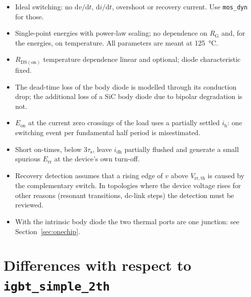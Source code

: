 \documentclass[11pt,a4paper]{article}
\newcommand{\Eon}{E_{\mathrm{on}}}
\newcommand{\Err}{E_{\mathrm{rr}}}
\newcommand{\Rdson}{R_{\mathrm{DS(on)}}}
\newcommand{\ih}{i_{\mathrm{h}}}
\newcommand{\idh}{i_{\mathrm{dh}}}
\newcommand{\taus}{\tau_{\mathrm{s}}}
\newcommand{\code}[1]{\texttt{#1}}
\begin{document}
\begin{itemize}
  \item Ideal switching: no $\mathrm{d}v/\mathrm{d}t$, $\mathrm{d}i/\mathrm{d}t$,
        overshoot or recovery current. Use \code{mos\_dyn} for those.
  \item Single-point energies with power-law scaling; no dependence on
        $R_\mathrm{G}$ and, for the energies, on temperature. All parameters are
        meant at \SI{125}{\celsius}.
  \item $\Rdson$ temperature dependence linear and optional; diode
        characteristic fixed.
  \item The dead-time loss of the body diode is modelled through its conduction
        drop; the additional loss of a SiC body diode due to bipolar degradation
        is not.
  \item $\Eon$ at the current zero crossings of the load uses a partially
        settled $\ih$: one switching event per fundamental half period is
        misestimated.
  \item Short on-times, below $3\taus$, leave $\idh$ partially flushed and
        generate a small spurious $\Err$ at the device's own turn-off.
  \item Recovery detection assumes that a rising edge of $v$ above
        $V_\mathrm{rr,th}$ is caused by the complementary switch. In topologies
        where the device voltage rises for other reasons (resonant transitions,
        dc-link steps) the detection must be reviewed.
  \item With the intrinsic body diode the two thermal ports are one junction:
        see Section~\ref{sec:onechip}.
\end{itemize}

\section{Differences with respect to \code{igbt\_simple\_2th}}
\end{document}
